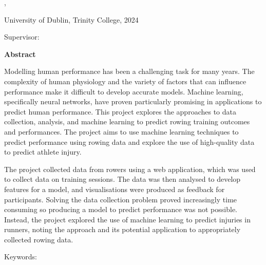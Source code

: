 \thispagestyle{plain}
\begin{center}
  \vspace{3cm}
  \textbf{\Huge\thesistitle}

  \thesissubtitle

  \authorname, \degree

  University of Dublin, Trinity College, 2024

  Supervisor: \supervisor

  \vspace{2cm}
  \textbf{Abstract}
\end{center}


Modelling human performance has been a challenging task for many years. The complexity of human physiology and the variety of factors that can influence performance make it difficult to develop accurate models. Machine learning, specifically neural networks, have proven particularly promising in applications to predict human performance. This project explores the approaches to data collection, analysis, and machine learning to predict rowing training outcomes and performances. The project aims to use machine learning techniques to predict performance using rowing data and explore the use of high-quality data to predict athlete injury. 

The project collected data from rowers using a web application, which was used to collect data on training sessions. The data was then analysed to develop features for a model, and visualisations were produced as feedback for participants. Solving the data collection problem proved increasingly time consuming so producing a model to predict performance was not possible. Instead, the project explored the use of machine learning to predict injuries in runners, noting the approach and its potential application to appropriately collected rowing data.

Keywords: \keywords